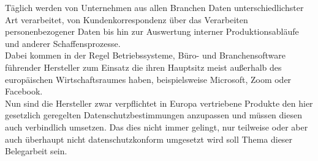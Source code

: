 Täglich werden von Unternehmen aus allen Branchen Daten unterschiedlichster Art verarbeitet, von Kundenkorrespondenz über das Verarbeiten personenbezogener Daten bis hin zur Auswertung interner Produktionsabläufe und anderer Schaffensprozesse.\\
Dabei kommen in der Regel Betriebssysteme, Büro- und Branchensoftware führender Hersteller zum Einsatz die ihren Hauptsitz meist außerhalb des europäischen Wirtschaftsraumes haben, beispielsweise Microsoft, Zoom oder Facebook.\\
Nun sind die Hersteller zwar verpflichtet in Europa vertriebene Produkte den hier gesetzlich geregelten Datenschutzbestimmungen anzupassen und müssen diesen auch verbindlich umsetzen. Das dies nicht immer gelingt, nur teilweise oder aber auch überhaupt nicht datenschutzkonform umgesetzt wird soll Thema dieser Belegarbeit sein.

